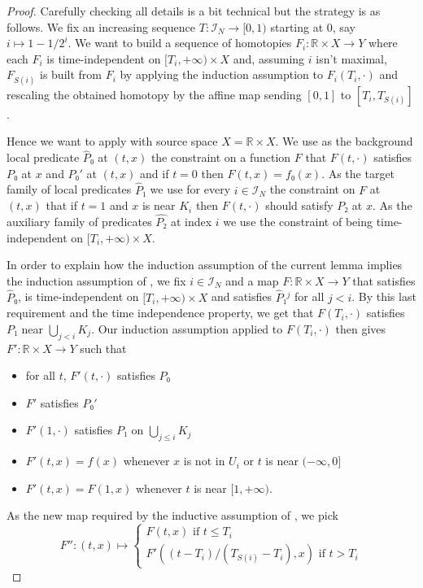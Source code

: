 \documentclass[10pt,a4paper]{article}
\newcommand{\co}{\!:}
\newcommand{\IT}[1]{\mathcal{I}_{#1}}
\newcommand{\uses}[1]{}
\newcommand{\leanok}{}
\begin{document}
\begin{proof}\leanok\uses{lem:inductive_construction, def:restrict_germ_predicate}
  Carefully checking all details is a bit technical but the strategy is as follows.
  We fix an increasing sequence $T \co \IT{N} → [0, 1)$ starting at $0$,
  say $i ↦ 1 - 1/2^i$.
  We want to build a sequence of homotopies $F_i \co ℝ × X → Y$ where each
  $F_i$ is time-independent on $[T_i, + ∞) × X$ and, assuming $i$ isn't
  maximal, $F_{S(i)}$ is built from $F_i$ by applying the induction assumption
  to $F_i(T_i, \cdot)$ and rescaling the obtained homotopy by the affine map
  sending $[0, 1]$ to $[T_i, T_{S(i)}]$.

  Hence we want to apply  with source space
  $\hat{X} = ℝ × X$.
  We use as the background local predicate $\hat{P}₀$ at $(t, x)$ the
  constraint on a function $F$ that $F(t, \cdot)$ satisfies $P₀$ at $x$ and $P₀'$ at
  $(t, x)$ and if $t = 0$ then $F(t, x) = f₀(x)$. As the target family of local predicates
  $\hat{P}₁$ we use for every $i ∈ \IT{N}$ the constraint on $F$ at $(t, x)$
  that if $t = 1$ and $x$ is near $K_i$ then $F(t, \cdot)$ should satisfy $P₂$
  at $x$. As the auxiliary family of predicates $\hat{P₂}$ at index $i$ we use
  the constraint of being time-independent on $[T_i, + ∞) × X$.

  In order to explain how the induction assumption of the current lemma implies
  the induction assumption of , we fix $i ∈ \IT{N}$
  and a map $F \co ℝ × X → Y$ that satisfies $\hat{P}₀$, is time-independent on
  $[T_i, + ∞) × X$ and satisfies $\hat{P}₁^j$ for all $j < i$. By this last
  requirement and the time independence property, we get that $F(T_i, \cdot)$
  satisfies $P₁$ near $\bigcup_{j < i} K_j$. Our induction assumption applied to
  $F(T_i, \cdot)$ then gives $F' \co ℝ × X → Y$ such that
  \begin{itemize}
    \item for all $t$, $F'(t, \cdot)$ satisfies $P₀$
    \item $F'$ satisfies $P₀'$
    \item $F'(1, \cdot)$ satisfies $P₁$ on $\bigcup_{j ≤ i} K_j$
    \item $F'(t, x) = f(x)$ whenever $x$ is not in $U_i$ or $t$ is near $(-∞, 0]$
    \item $F'(t, x) = F(1, x)$ whenever $t$ is near $[1, +∞)$.
  \end{itemize}
  As the new map required by the inductive assumption of ,
  we pick
  \[
    F'' \co (t, x) ↦
    \begin{cases}
      F(t, x) \text{ if $t ≤ T_i$}\\
      F'\left((t - T_i)/(T_{S(i)} - T_i), x\right) \text{ if $t > T_i$}
    \end{cases}
  \]


\end{proof}
\end{document}
